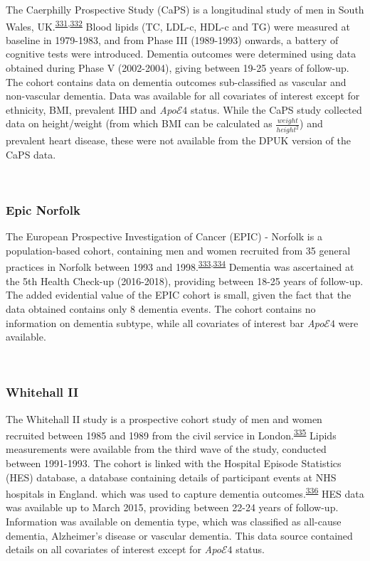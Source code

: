 \documentclass[a4paper, twoside]{templates/ociamthesis}
\begin{document}
The Caerphilly Prospective Study (CaPS) is a longitudinal study of men in South Wales, UK.\textsuperscript{\protect\hyperlink{ref-zotero-15398}{331},\protect\hyperlink{ref-elwood2013}{332}} Blood lipids (TC, LDL-c, HDL-c and TG) were measured at baseline in 1979-1983, and from Phase III (1989-1993) onwards, a battery of cognitive tests were introduced. Dementia outcomes were determined using data obtained during Phase V (2002-2004), giving between 19-25 years of follow-up. The cohort contains data on dementia outcomes sub-classified as vascular and non-vascular dementia. Data was available for all covariates of interest except for ethnicity, BMI, prevalent IHD and \emph{Apo}\(\mathcal{E}4\) status. While the CaPS study collected data on height/weight (from which BMI can be calculated as \(\frac{weight}{height^2}\)) and prevalent heart disease, these were not available from the DPUK version of the CaPS data.

~

\hypertarget{epic-norfolk}{%
\subsubsection{Epic Norfolk}\label{epic-norfolk}}

The European Prospective Investigation of Cancer (EPIC) - Norfolk is a population-based cohort, containing men and women recruited from 35 general practices in Norfolk between 1993 and 1998.\textsuperscript{\protect\hyperlink{ref-riboli1997}{333},\protect\hyperlink{ref-riboli2002}{334}} Dementia was ascertained at the 5th Health Check-up (2016-2018), providing between 18-25 years of follow-up. The added evidential value of the EPIC cohort is small, given the fact that the data obtained contains only 8 dementia events. The cohort contains no information on dementia subtype, while all covariates of interest bar \emph{Apo}\(\mathcal{E}4\) were available.

~

\hypertarget{whitehall-ii}{%
\subsubsection{Whitehall II}\label{whitehall-ii}}

The Whitehall II study is a prospective cohort study of men and women recruited between 1985 and 1989 from the civil service in London.\textsuperscript{\protect\hyperlink{ref-marmot2005}{335}} Lipids measurements were available from the third wave of the study, conducted between 1991-1993. The cohort is linked with the Hospital Episode Statistics (HES) database, a database containing details of participant events at NHS hospitals in England. which was used to capture dementia outcomes.\textsuperscript{\protect\hyperlink{ref-zotero-15403}{336}} HES data was available up to March 2015, providing between 22-24 years of follow-up. Information was available on dementia type, which was classified as all-cause dementia, Alzheimer's disease or vascular dementia. This data source contained details on all covariates of interest except for \emph{Apo}\(\mathcal{E}4\) status.
\end{document}
